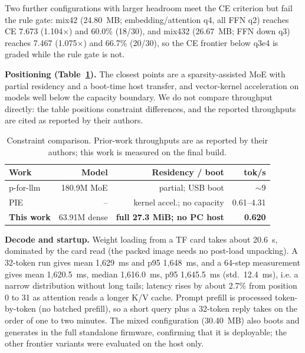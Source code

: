 \documentclass[journal,letterpaper]{IEEEtran}
\begin{document}
Two further configurations with larger headroom meet the CE criterion but fail the rule gate:
mix42 (24.80~MB; embedding/attention q4, all FFN q2) reaches CE 7.673 (1.104$\times$) and
60.0\% (18/30), and mix432 (26.67~MB; FFN down q3) reaches 7.467 (1.075$\times$) and 66.7\%
(20/30), so the CE frontier below q3e4 is graded while the rule gate is not.

\textbf{Positioning (Table~\ref{tab:compare}).} The closest points are a sparsity-assisted MoE
with partial residency and a boot-time host transfer, and vector-kernel acceleration on models
well below the capacity boundary. We do not compare throughput directly: the table positions
constraint differences, and the reported throughputs are cited as reported by their authors.

\begin{table}[t]
\centering
\caption{Constraint comparison. Prior-work throughputs are as reported by their authors; this work is measured on the final build.}
\label{tab:compare}
\footnotesize
\setlength{\tabcolsep}{2.5pt}
\begin{tabular}{@{}lrrr@{}}
\toprule
Work & Model & Residency / boot & tok/s \\
\midrule
p-for-llm & 180.9M MoE & partial; USB boot & $\sim$9 \\
PIE & -- & kernel accel.; no capacity & 0.61--4.31 \\
\textbf{This work} & 63.91M dense & \textbf{full 27.3 MiB; no PC host} & \textbf{0.620} \\
\bottomrule
\end{tabular}
\end{table}

\textbf{Decode and startup.} Weight loading from a TF card takes about 20.6~s, dominated by the
card read (the packed image needs no post-load unpacking). A 32-token run gives mean 1,629~ms and
p95 1,648~ms, and a 64-step measurement gives mean 1,620.5~ms, median 1,616.0~ms, p95
1,645.5~ms (std.\ 12.4~ms), i.e. a narrow distribution without long tails; latency rises by about
2.7\% from position 0 to 31 as attention reads a longer K/V cache. Prompt prefill is processed
token-by-token (no batched prefill), so a short query plus a 32-token reply takes on the order of
one to two minutes. The mixed configuration (30.40~MB) also boots and generates in the full
standalone firmware, confirming that it is deployable; the other frontier variants were evaluated
on the host only.
\end{document}
